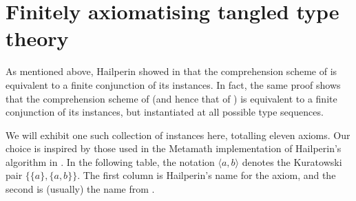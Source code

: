 \section{Finitely axiomatising tangled type theory}

As mentioned above, Hailperin showed in \cite{hailperin-finite-axiomatisation} that the comprehension scheme of {\NF} is equivalent to a finite conjunction of its instances.
In fact, the same proof shows that the comprehension scheme of {\TST} (and hence that of {\TTT}) is equivalent to a finite conjunction of its instances, but instantiated at all possible type sequences.

We will exhibit one such collection of instances here, totalling eleven axioms.
Our choice is inspired by those used in the Metamath implementation of Hailperin's algorithm in \cite{metamath-nf}.
In the following table, the notation \( \langle a, b \rangle \) denotes the Kuratowski pair \( \{ \{ a \}, \{ a, b \} \} \).
The first column is Hailperin's name for the axiom, and the second is (usually) the name from \cite{metamath-nf}.
